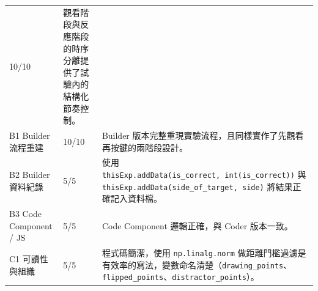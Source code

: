 \documentclass[14pt,]{extarticle}
\begin{document}
\begin{longtable}[]{@{}lll@{}}
\begin{minipage}[t]{0.03\columnwidth}
10/10\strut
\end{minipage} & \begin{minipage}[t]{0.80\columnwidth}\raggedright
觀看階段與反應階段的時序分離提供了試驗內的結構化節奏控制。\strut
\end{minipage}\tabularnewline
\begin{minipage}[t]{0.09\columnwidth}\raggedright
B1 Builder 流程重建\strut
\end{minipage} & \begin{minipage}[t]{0.03\columnwidth}\raggedright
10/10\strut
\end{minipage} & \begin{minipage}[t]{0.80\columnwidth}\raggedright
Builder
版本完整重現實驗流程，且同樣實作了先觀看再按鍵的兩階段設計。\strut
\end{minipage}\tabularnewline
\begin{minipage}[t]{0.09\columnwidth}\raggedright
B2 Builder 資料紀錄\strut
\end{minipage} & \begin{minipage}[t]{0.03\columnwidth}\raggedright
5/5\strut
\end{minipage} & \begin{minipage}[t]{0.80\columnwidth}\raggedright
使用
\texttt{thisExp.addData(\textquotesingle{}is\_correct\textquotesingle{},\ int(is\_correct))}
與
\texttt{thisExp.addData(\textquotesingle{}side\_of\_target\textquotesingle{},\ side)}
將結果正確記入資料檔。\strut
\end{minipage}\tabularnewline
\begin{minipage}[t]{0.09\columnwidth}\raggedright
B3 Code Component / JS\strut
\end{minipage} & \begin{minipage}[t]{0.03\columnwidth}\raggedright
5/5\strut
\end{minipage} & \begin{minipage}[t]{0.80\columnwidth}\raggedright
Code Component 邏輯正確，與 Coder 版本一致。\strut
\end{minipage}\tabularnewline
\begin{minipage}[t]{0.09\columnwidth}\raggedright
C1 可讀性與組織\strut
\end{minipage} & \begin{minipage}[t]{0.03\columnwidth}\raggedright
5/5\strut
\end{minipage} & \begin{minipage}[t]{0.80\columnwidth}\raggedright
程式碼簡潔，使用 \texttt{np.linalg.norm}
做距離門檻過濾是有效率的寫法，變數命名清楚（\texttt{drawing\_points}、\texttt{flipped\_points}、\texttt{distractor\_points}）。\strut

\end{minipage}
\end{longtable}
\end{document}
